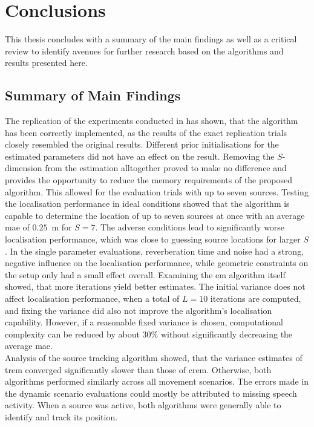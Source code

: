 \chapter{Conclusions}
\label{chap:concl}
This thesis concludes with a summary of the main findings as well as a critical review to identify avenues for further research based on the algorithms and results presented here.

\section{Summary of Main Findings}

The replication of the experiments conducted in \cite{Schwartz2014} has shown, that the algorithm has been correctly implemented, as the results of the exact replication trials closely resembled the original results. Different prior initialisations for the estimated parameters did not have an effect on the result. Removing the $S$-dimension from the estimation alltogether proved to make no difference and provides the opportunity to reduce the memory requirements of the proposed algorithm. This allowed for the evaluation trials with up to seven sources. Testing the localisation performance in ideal conditions showed that the algorithm is capable to determine the location of up to seven sources at once with an average \gls{mae} of $0.25$~m for $S=7$. The adverse conditions lead to significantly worse localisation performance, which was close to guessing source locations for larger $S$. In the single parameter evaluations, reverberation time and noise had a strong, negative influence on the localisation performance, while geometric constraints on the setup only had a small effect overall. Examining the \gls{em} algorithm itself showed, that more iterations yield better estimates. The initial variance does not affect localisation performance, when a total of $L=10$ iterations are computed, and fixing the variance did also not improve the algorithm's localisation capability. However, if a reasonable fixed variance is chosen, computational complexity can be reduced by about $30\%$ without significantly decreasing the average \gls{mae}.\\


Analysis of the source tracking algorithm showed, that the variance estimates of \gls{trem} converged significantly slower than those of \gls{crem}. Otherwise, both algorithms performed similarly across all movement scenarios. The errors made in the dynamic scenario evaluations could mostly be attributed to missing speech activity. When a source was active, both algorithms were generally able to identify and track its position.

